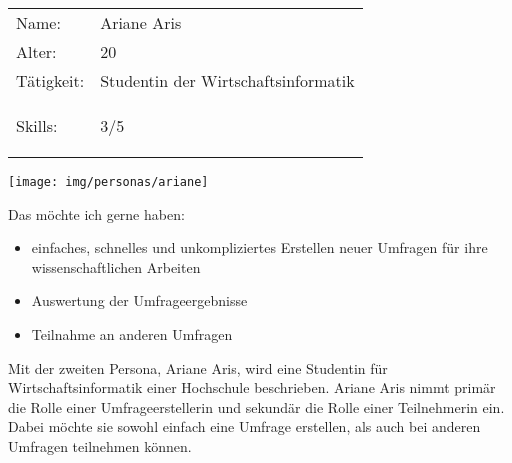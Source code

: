 \newcommand{\ariane}{Ariane Aris\xspace}
%
\newpage
\cvsect{\ariane}
\begin{minipage}[t]{0.5\textwidth}
	\vspace{-3.6cm}
	\renewcommand{\arraystretch}{1.5}
	\begin{tabular}{l l}
		Name: & \ariane \\
		Alter: & 20 \\
		Tätigkeit: & Studentin der Wirtschaftsinformatik \\
		Skills: & 3/5 \hspace{-1cm} \begin{barchart}{5.0}
			\baritemNL{}{3}
		\end{barchart} \\
	\end{tabular}
\end{minipage}
\hfill
\begin{minipage}[t]{0.4\textwidth}
	\flushright
	\texttt{[image: img/personas/ariane]}
\end{minipage}
\autocite{rf-unsplash-studentin}

Das möchte ich gerne haben:
\begin{itemize}
	\item einfaches, schnelles und unkompliziertes Erstellen neuer Umfragen für ihre wissenschaftlichen Arbeiten
	\item Auswertung der Umfrageergebnisse
    \item Teilnahme an anderen Umfragen
\end{itemize}

Mit der zweiten Persona, \ariane, wird eine Studentin für Wirtschaftsinformatik einer Hochschule beschrieben.
\ariane nimmt primär die Rolle einer Umfrageerstellerin und sekundär die Rolle einer Teilnehmerin ein.
Dabei möchte sie sowohl einfach eine Umfrage erstellen, als auch bei anderen Umfragen teilnehmen können.